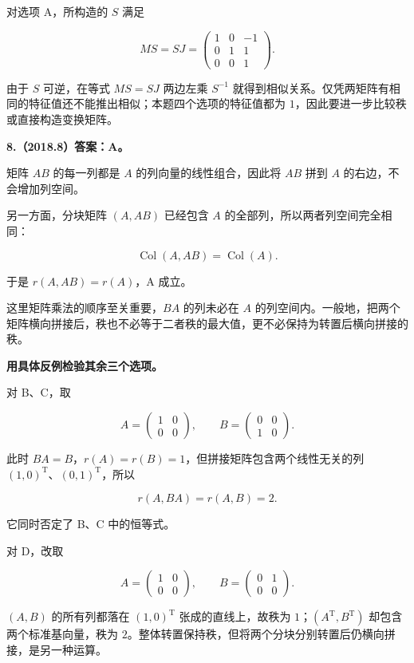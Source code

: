 \documentclass[UTF8,11pt,fontset=windows]{ctexart}
\begin{document}
对选项 A，所构造的 $S$ 满足

$$
MS=SJ=\begin{pmatrix}1&0&-1\\0&1&1\\0&0&1\end{pmatrix}.
$$

由于 $S$ 可逆，在等式 $MS=SJ$ 两边左乘 $S^{-1}$ 就得到相似关系。仅凭两矩阵有相同的特征值还不能推出相似；本题四个选项的特征值都为 $1$，因此要进一步比较秩或直接构造变换矩阵。

\clearpage

\textbf{8.（2018.8）答案：A。}

矩阵 $AB$ 的每一列都是 $A$ 的列向量的线性组合，因此将 $AB$ 拼到 $A$ 的右边，不会增加列空间。

另一方面，分块矩阵 $(A,AB)$ 已经包含 $A$ 的全部列，所以两者列空间完全相同：

$$
\operatorname{Col}(A,AB)=\operatorname{Col}(A).
$$

于是 $r(A,AB)=r(A)$，A 成立。

这里矩阵乘法的顺序至关重要，$BA$ 的列未必在 $A$ 的列空间内。一般地，把两个矩阵横向拼接后，秩也不必等于二者秩的最大值，更不必保持为转置后横向拼接的秩。

\textbf{用具体反例检验其余三个选项。}

对 B、C，取

$$
A=\begin{pmatrix}1&0\\0&0\end{pmatrix},\qquad
B=\begin{pmatrix}0&0\\1&0\end{pmatrix}.
$$

此时 $BA=B$，$r(A)=r(B)=1$，但拼接矩阵包含两个线性无关的列 $(1,0)^{\mathrm T}$、$(0,1)^{\mathrm T}$，所以

$$
r(A,BA)=r(A,B)=2.
$$

它同时否定了 B、C 中的恒等式。

对 D，改取

$$
A=\begin{pmatrix}1&0\\0&0\end{pmatrix},\qquad
B=\begin{pmatrix}0&1\\0&0\end{pmatrix}.
$$

$(A,B)$ 的所有列都落在 $(1,0)^{\mathrm T}$ 张成的直线上，故秩为 $1$；$(A^{\mathrm T},B^{\mathrm T})$ 却包含两个标准基向量，秩为 $2$。整体转置保持秩，但将两个分块分别转置后仍横向拼接，是另一种运算。
\end{document}
